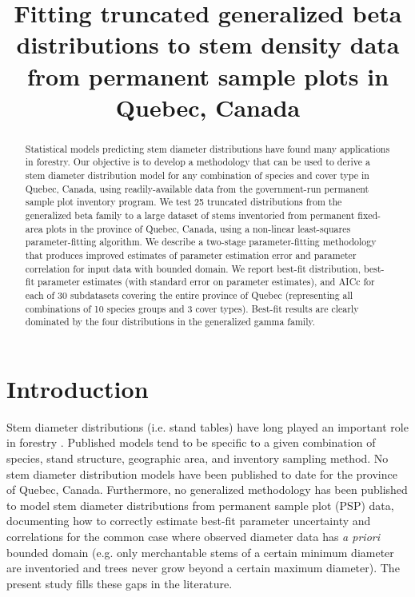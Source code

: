 \documentclass{article}
\title{Fitting truncated generalized beta distributions to stem density data from permanent sample plots in Quebec, Canada}
\author{}
\date{}
\begin{document}
\maketitle

\begin{abstract}
Statistical models predicting stem diameter distributions have found many applications in forestry.
Our objective is to develop a methodology that can be used to derive a stem diameter distribution model for any combination of species and cover type in Quebec, Canada, using readily-available data from the government-run permanent sample plot inventory program. 
We test 25 truncated distributions from the generalized beta family to a large dataset of stems inventoried from permanent fixed-area plots in the province of Quebec, Canada, using a non-linear least-squares parameter-fitting algorithm.
We describe a two-stage parameter-fitting methodology that produces improved estimates of parameter estimation error and parameter correlation for input data with bounded domain.
We report best-fit distribution, best-fit parameter estimates (with standard error on parameter estimates), and AICc for each of 30 subdatasets covering the entire province of Quebec (representing all combinations of 10 species groups and 3 cover types).
Best-fit results are clearly dominated by the four distributions in the generalized gamma family. 
\end{abstract}

\linenumbers 
\doublespace 

\clearpage
\section{Introduction}
\label{sec:introduction}

Stem diameter distributions (i.e. stand tables) have long played an important role in forestry \citep{bailey1973quantifying, hyink1983generalized}.
Published models tend to be specific to a given combination of species, stand structure, geographic area, and inventory sampling method. 
No stem diameter distribution models have been published to date for the province of Quebec, Canada.
Furthermore, no generalized methodology has been published to model stem diameter distributions from permanent sample plot (PSP) data, documenting how to correctly estimate best-fit parameter uncertainty and correlations for the common case where observed diameter data has \emph{a priori} bounded domain (e.g. only merchantable stems of a certain minimum diameter are inventoried and trees never grow beyond a certain maximum diameter).
The present study fills these gaps in the literature.
\end{document}
